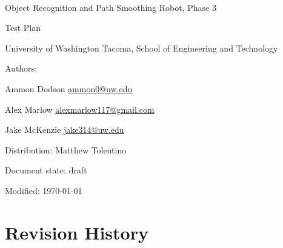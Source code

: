 \documentclass[english,12pt]{article}
\begin{document}
\begin{center}

\thispagestyle{empty}

$ $

\vspace{250pt}

\begin{bfseries}

{\Large Object Recognition and Path Smoothing Robot, Phase 3}

{\Huge Test Plan}


\end{bfseries}

\vspace{180pt}

University of Washington Tacoma, School of Engineering and Technology


\vspace{12pt}

Authors: 

Ammon Dodson \href{mailto:ammon0@uw.edu}{ammon0@uw.edu} 

Alex Marlow \href{mailto:alexmarlow117@gmail.com}{alexmarlow117@gmail.com} 

Jake McKenzie \href{mailto:jake314@uw.edu}{jake314@uw.edu}

Distribution: Matthew Tolentino

Document state: draft

Modified: \today

\end{center}

\newpage


\tableofcontents

\newpage


\section{Revision History}
\end{document}
